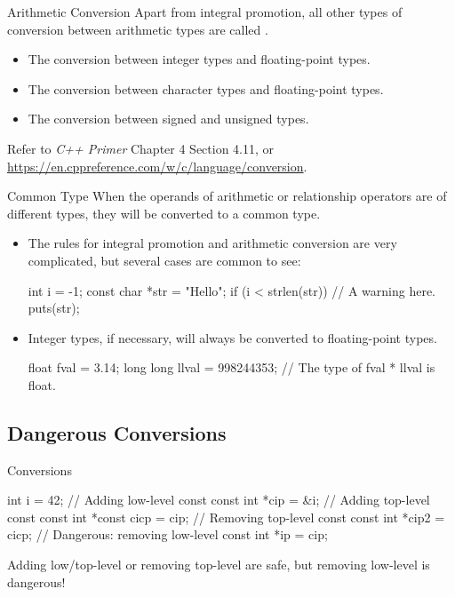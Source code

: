 \documentclass[handout]{beamer}
\begin{document}
\begin{frame}{Arithmetic Conversion}
    Apart from integral promotion, all other types of conversion between arithmetic types are called .
    \begin{itemize}
        \item The conversion between integer types and floating-point types.
        \item The conversion between character types and floating-point types.
        \item The conversion between signed and unsigned types.
    \end{itemize}
    Refer to \textit{C++ Primer} Chapter 4 Section 4.11, or \url{https://en.cppreference.com/w/c/language/conversion}.
\end{frame}

\begin{frame}[fragile]{Common Type}
    When the operands of arithmetic or relationship operators are of different types, they will be converted to a common type.
    \pause
    \begin{itemize}
        \item The rules for integral promotion and arithmetic conversion are very complicated, but several cases are common to see:
        \begin{cpp}
int i = -1;
const char *str = "Hello";
if (i < strlen(str)) // A warning here.
  puts(str);
        \end{cpp}
        \pause
        \item Integer types, if necessary, will always be converted to floating-point types.
        \begin{cpp}
float fval = 3.14;
long long llval = 998244353;
// The type of fval * llval is float.
        \end{cpp}
    \end{itemize}
\end{frame}

\subsection{Dangerous Conversions}

\begin{frame}[fragile]{ Conversions}
    \begin{cpp}
int i = 42;
// Adding low-level const
const int *cip = &i;
// Adding top-level const
const int *const cicp = cip;
// Removing top-level const
const int *cip2 = cicp;
// Dangerous: removing low-level const
int *ip = cip;
    \end{cpp}
    \pause
    Adding low/top-level  or removing top-level  are safe, but removing low-level  is dangerous!
\end{frame}
\end{document}
